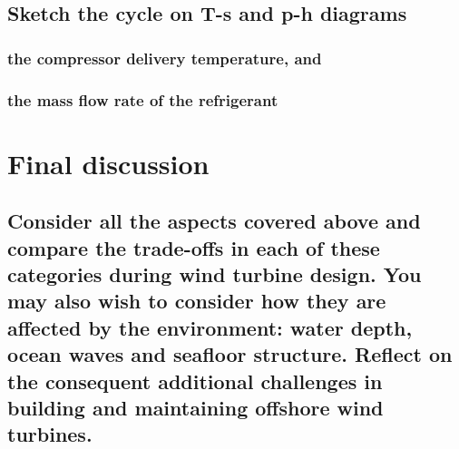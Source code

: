 \documentclass[12pt]{article}
\begin{document}
\begin{flushleft}
\subsection{Sketch the cycle on T-s and p-h diagrams}
\subsubsection{the compressor delivery temperature, and}
\subsubsection{the mass flow rate of the refrigerant}

\section{Final discussion}
\subsection{Consider all the aspects covered above and compare the trade-offs in each of these categories during wind turbine design. You may also wish to consider how they are affected by the environment: water depth, ocean waves and seafloor structure. Reflect on the consequent additional challenges in building and maintaining offshore wind turbines.}



\end{flushleft}
\end{document}
